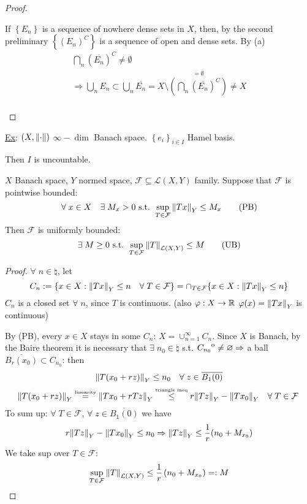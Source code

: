 \begin{proof}
\begin{itemize}
        If \(\left\{ E_n \right\}\) is a sequence of nowhere dense sets in \(X\), then, by the second preliminary \(\left\{ (E_n)^C \right\}\) is a sequence of open and dense sets. By (a) 
        \[
            \begin{array}{l}
                \bigcap_n (\overline{E_n})^C \neq \emptyset \\
                \Rightarrow \bigcup_n E_n \subset \bigcup_n \overline{E_n} = X \setminus \overset{= \emptyset}{\left(\bigcap_n (\overline{E_n})^C\right)} \neq X \\

            \end{array} 
        \]
    \end{itemize}
\end{proof}
\noindent\underline{Ex}: \((X, \norm{\cdot})\) \(\infty-\dim\) Banach space. \(\left\{ e_i \right\}_{i \in I}\) Hamel basis. 

Then \(I\) is uncountable.
\begin{theorem}
    \(X\) Banach space, \(Y\) normed space, \(\mathcal{F} \subseteq \mathcal{L}(X, Y)\) family.
    Suppose that \(\mathcal{F}\) is pointwise bounded: 
    \[
        \forall\; x \in X \quad \exists \; M_x >0 \text{ s.t. } \sup_{T \in \mathcal{F}} \norm{Tx}_Y \leq M_x \tag*{(PB)}
    \]
    Then \(\mathcal{F} \) is uniformly bounded: 
    \[
        \exists \; M \geq 0 \text{ s.t. } \sup_{T \in \mathcal{F}} \norm{T}_{\mathcal{L}(X, Y)} \leq M \tag*{(UB)}
    \]
\end{theorem}
\begin{proof}
    \(\forall \; n \in \natural\), let 
    \[
        C_n := \{ x \in X: \norm{Tx}_Y \leq n \quad \forall \; T \in \mathcal{F} \} 
        = \cap_{T \in \mathcal{F}} \{ x \in X: \norm{Tx}_Y \leq n \}
    \]
    \(C_n\) is a closed set \(\forall \; n\), since \(T\) is continuous. (also \(\varphi: X \to \mathbb{R} \) \(\varphi(x)=\norm{Tx}_Y\) is continuous)

    By (PB), every \(x \in X\) stays in some \(C_n\): \(X = \cup_{n=1}^\infty C_n\). 
    Since \(X\) is Banach, by the Baire theorem it is necessary that \(\exists \; n_0 \in \natural\) s.t. \({\kern0ptC_{n_0}}^{\mathrm{o}} \neq \varnothing \Rightarrow\) a ball \(\overline{B_r(x_0)} \subset C_{n_0}\): then
    \[
        \norm{T(x_0+rz)}_Y \leq n_0 \quad \forall \; z \in \overline{B_1(0)}
    \]
    \[
        \norm{T(x_0 + rz)}_Y \overset{\text{\tiny{linearity}}}{=} \norm{Tx_0 + rTz}_Y \overset{\text{\tiny{triangle ineq}}}{\leq} r\norm{Tz}_Y - \norm{Tx_0}_Y \quad \forall \; T \in \mathcal{F} \; 
    \]
    To sum up: \(\forall \; T \in \mathcal{F} \), \(\forall \; z \in \overline{B_1(0)}\) we have 
    \[
        r \norm{Tz}_Y - \norm{Tx_0}_Y \leq n_0 \Rightarrow \norm{Tz}_Y \leq \frac{1}{r}(n_0 + M_{x_0})
    \]
    We take sup over \(T \in \mathcal{F}\):
    \[
        \sup_{T \in \mathcal{F}} \norm{T}_{\mathcal{L}(X, Y)} \leq \frac{1}{r} \left(n_0 + M_{x_0}\right) =: M
    \]
\end{proof}

